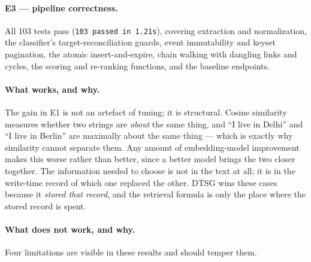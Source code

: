 \documentclass[11pt,a4paper]{article}
\begin{document}
\paragraph{E3 --- pipeline correctness.} All 103 tests pass
(\texttt{103 passed in 1.21s}), covering extraction and normalization, the
classifier's target-reconciliation guards, event immutability and keyset
pagination, the atomic insert-and-expire, chain walking with dangling links and
cycles, the scoring and re-ranking functions, and the baseline endpoints.

\paragraph{What works, and why.} The gain in E1 is not an artefact of tuning; it
is structural. Cosine similarity measures whether two strings are \emph{about}
the same thing, and ``I live in Delhi'' and ``I live in Berlin'' are maximally
about the same thing --- which is exactly why similarity cannot separate them.
Any amount of embedding-model improvement makes this worse rather than better,
since a better model brings the two closer together. The information needed to
choose is not in the text at all; it is in the write-time record of which one
replaced the other. DTSG wins these cases because it \emph{stored that record},
and the retrieval formula is only the place where the stored record is spent.

\paragraph{What does not work, and why.} Four limitations are visible in these
results and should temper them.
\end{document}
